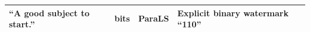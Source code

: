\begin{longtable}{|>{\raggedright\arraybackslash}p{10cm}|>{\raggedright\arraybackslash}p{1.2cm}|>{\raggedright\arraybackslash}p{1cm}|>{\raggedright\arraybackslash}p{2cm}|}
  ``A good subject to start.''                                                                                                                                                                                                                                                                                                                                                                                                                                                                                                                                                                                                                                                                                                                                                                                                                                                                                                                                                                                                                                                                                                                                                                                                                                                                                                                                                                                                                                                                                                                                                                                                                                                                                                                                                                                                                                                                                                                                                                                                                                                                                                                                                                                                                                            & 3 bits       & ParaLS          & Explicit binary watermark ``110''                      \\ \hline

\end{longtable}
